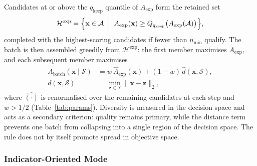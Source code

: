 \documentclass[final,5p,times,twocolumn]{elsarticle}
\newcommand{\vx}{\mathbf{x}}
\newcommand{\vz}{\mathbf{z}}
\begin{document}
Candidates at or above the $q_{\mathrm{keep}}$ quantile of $A_{\mathrm{exp}}$
form the retained set
\begin{equation}
\mathcal{H}^{\mathrm{exp}}=\Bigl\{\vx\in\mathcal{A}\;\Bigm|\;
A_{\mathrm{exp}}(\vx)\geq
Q_{q_{\mathrm{keep}}}\bigl(A_{\mathrm{exp}}(\mathcal{A})\bigr)\Bigr\},
\label{eq:prefilter-exp}
\end{equation}
completed with the highest-scoring candidates if fewer than $n_{\min}$ qualify.
The batch is then assembled greedily from $\mathcal{H}^{\mathrm{exp}}$: the
first member maximises $A_{\mathrm{exp}}$, and each subsequent member maximises
\begin{equation}
\begin{split}
A_{\mathrm{batch}}(\vx\mid\mathcal{S})
&=w\,\widehat A_{\mathrm{exp}}(\vx)
+(1-w)\,\widehat d(\vx,\mathcal{S}),\\
d(\vx,\mathcal{S})&=\min_{\vz\in\mathcal{S}}\|\vx-\vz\|_2,
\end{split}
\label{eq:greedy}
\end{equation}
where $\widehat{(\cdot)}$ is renormalised over the remaining candidates at each
step and $w>1/2$ (Table~\ref{tab:params}). Diversity is measured in the decision
space and acts as a secondary criterion: quality remains primary, while the
distance term prevents one batch from collapsing into a single region of the
decision space. The rule does not by itself promote spread in objective space.

\subsubsection{Indicator-Oriented Mode}
\label{sec:method:candidate:ind}
\end{document}

